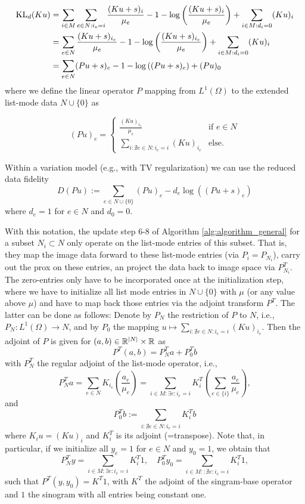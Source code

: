 \documentclass{article}
\begin{document}
\begin{align*}
\operatorname{KL}_d(Ku) 
& = \sum_{i \in M} \sum_{e \in N: i_e = i} \frac{(Ku + s)_i}{\mu_{e}} - 1 - \log \left(\frac{(Ku + s)_i}{\mu_{e}} \right) + \sum_{i \in M: d_i = 0} (Ku)_i  \\
& =  \sum_{e \in N} \frac{(Ku+s)_{i_e}}{\mu_{e}} - 1 - \log \left(\frac{(Ku+s)_{i_e}}{\mu_{e}} \right)
+ \sum_{i \in M: d_i = 0} (Ku)_i \\ 
& = \sum_{e \in N} (Pu+s)_e - 1 - \log \left((Pu+s)_e \right)
+ (Pu)_0
\end{align*}
where we define the linear operator $P$ mapping from $L^1(\Omega)$ to the extended list-mode data $N \cup \{0\}$ as

\[ (Pu) _e = \begin{cases}
 \frac{(Ku)_{i_e}}{\mu_e} & \text{if } e \in N \\
 \sum_{i: \nexists e \in N: i_e = i} (Ku)_{i_e} & \text{else.}
\end{cases}
\]


Within a variation model (e.g., with TV regularization) we can use the reduced data fidelity
\[ D(Pu):= \sum_{e \in N \cup \{ 0 \}} (Pu)_e - d_e \log ( (Pu+s)_e) \]
where $d_e = 1$ for $e \in N$ and $d_0 = 0$. 

With this notation, the update step 6-8 of Algorithm \ref{alg:algorithm_general} for a subset $N_i \subset N$ only operate on the list-mode entries of this subset. That is, they map the image data forward to these list-mode entries (via $P_i= P_{N_i}$), carry out the prox on these entries, an project the data back to image space via $P_{N_i}^T$. The zero-entries only have to be incorporated once at the initialization step, where we have to initialize all list mode entries in $N \cup \{ 0\}$ with $\mu$ (or any value above $\mu$) and have to map back those entries via the adjoint transform $P^T$.
The latter can be done as follows: Denote by $P_N$ the restriction of $P$ to $N$, i.e., $P_N:L^1(\Omega) \rightarrow N$, and by $P_0$ the mapping $u \mapsto \sum_{i: \nexists e \in N: i_e = i} (Ku)_{i_e}$. Then the adjoint of $P$ is given for $(a,b) \in \mathbb{R}^{|N|} \times \mathbb{R}$  as
\[ P^T(a,b) = P_N^T a + P_0^T b \]
with $P_N^T$ the regular adjoint of the list-mode operator, i.e., 
\[ P_N^T a = \sum_{e \in N} K_{i_e} \left(\frac{a_e}{\mu_e}\right) = \sum_{i  \in M:\exists e:i_e = i} K^T_i \left( \sum_{e \in \{i\}} \frac{a_e}{\mu_e} \right), \] 
 and 
\[ P_0^Tb:= \sum_{i: \nexists e \in N: i_e = i} K_i^T b
\]
where $K_iu = (Ku)_i$ and $K_i^T$ is its adjoint (=transpose). Note that, in particular, if we initialize all $y_e=1$ for $e \in N$ and $y_0 = 1$, we obtain that
\[ P_N^Ty = \sum_{i \in M:\exists e:i_e = i} K^T_i 1  , \quad P_0^Ty_0 = \sum_{i \in M: :\nexists e:i_e = i}K_i^T 1,\]
such that $P^T(y,y_0) = K^T1$, with $K^T$ the adjoint of the singram-base operator and $1$ the sinogram with all entries being constant one.






\end{document}
